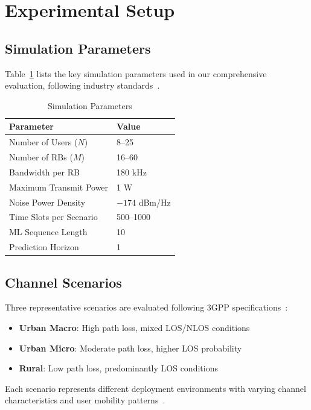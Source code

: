 \documentclass[conference]{IEEEtran}
\begin{document}
\section{Experimental Setup}

\subsection{Simulation Parameters}

Table~\ref{tab:sim_params} lists the key simulation parameters used in our comprehensive evaluation, following industry standards~\cite{3gpp_6g,simulation_methodology}.

\begin{table}[h]
\centering
\caption{Simulation Parameters}
\label{tab:sim_params}
\begin{tabular}{@{}ll@{}}
\toprule
\textbf{Parameter} & \textbf{Value} \\
\midrule
Number of Users ($N$) & 8--25 \\
Number of RBs ($M$) & 16--60 \\
Bandwidth per RB & 180 kHz \\
Maximum Transmit Power & 1 W \\
Noise Power Density & $-174$ dBm/Hz \\
Time Slots per Scenario & 500--1000 \\
ML Sequence Length & 10 \\
Prediction Horizon & 1 \\
\bottomrule
\end{tabular}
\end{table}

\subsection{Channel Scenarios}

Three representative scenarios are evaluated following 3GPP specifications~\cite{tse_fundamentals}:
\begin{itemize}
    \item \textbf{Urban Macro}: High path loss, mixed LOS/NLOS conditions~\cite{channel_estimation}
    \item \textbf{Urban Micro}: Moderate path loss, higher LOS probability~\cite{csi_feedback}
    \item \textbf{Rural}: Low path loss, predominantly LOS conditions~\cite{tse_fundamentals}
\end{itemize}

Each scenario represents different deployment environments with varying channel characteristics and user mobility patterns~\cite{nextg_requirements}.
\end{document}
